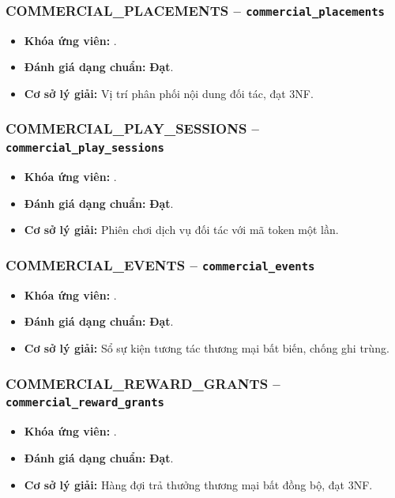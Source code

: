 \subsubsection{COMMERCIAL_PLACEMENTS -- \texttt{commercial\_placements}}
\begin{itemize}
  \item \textbf{Khóa ứng viên:} \texttt{}.
  \item \textbf{Đánh giá dạng chuẩn:} \textbf{Đạt}.
  \item \textbf{Cơ sở lý giải:} Vị trí phân phối nội dung đối tác, đạt 3NF.
\end{itemize}

\subsubsection{COMMERCIAL_PLAY_SESSIONS -- \texttt{commercial\_play\_sessions}}
\begin{itemize}
  \item \textbf{Khóa ứng viên:} \texttt{}.
  \item \textbf{Đánh giá dạng chuẩn:} \textbf{Đạt}.
  \item \textbf{Cơ sở lý giải:} Phiên chơi dịch vụ đối tác với mã token một lần.
\end{itemize}

\subsubsection{COMMERCIAL_EVENTS -- \texttt{commercial\_events}}
\begin{itemize}
  \item \textbf{Khóa ứng viên:} \texttt{}.
  \item \textbf{Đánh giá dạng chuẩn:} \textbf{Đạt}.
  \item \textbf{Cơ sở lý giải:} Sổ sự kiện tương tác thương mại bất biến, chống ghi trùng.
\end{itemize}

\subsubsection{COMMERCIAL_REWARD_GRANTS -- \texttt{commercial\_reward\_grants}}
\begin{itemize}
  \item \textbf{Khóa ứng viên:} \texttt{}.
  \item \textbf{Đánh giá dạng chuẩn:} \textbf{Đạt}.
  \item \textbf{Cơ sở lý giải:} Hàng đợi trả thưởng thương mại bất đồng bộ, đạt 3NF.
\end{itemize}


